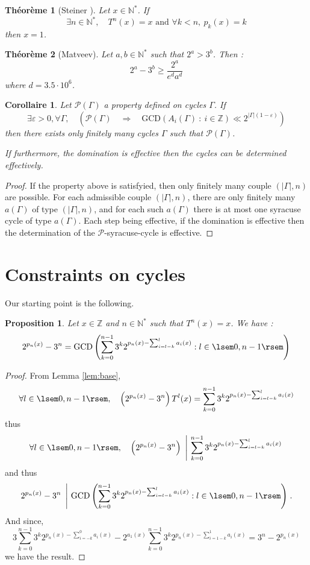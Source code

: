 \documentclass[12pt,a4paper]{article}
\newtheorem{cor}[lem]{Corollaire}
\newtheorem{prop}[lem]{Proposition}
\newtheorem{theo}{Théorème}
\def\NN{\mathbb{N}}
\def\ZZ{\mathbb{Z}}
\begin{document}
\begin{theo}[Steiner \cite{}] Let $x\in \NN^*$. 
If 
$$\exists n\in\NN^*,\quad T^n(x)=x \text{~and~} \forall k< n,~p_k(x)=k$$
then $x=1$.
\end{theo}

\begin{theo}[Matveev] Let $a,b\in \NN^*$ such that $2^a>3^b$.
 Then :
 $$2^a-3^b \geq \frac{2^a}{e^da^d} $$
 where $d = 3.5\cdot 10^6$.
\end{theo}
\begin{cor} Let $\mathcal P(\Gamma)$ a property defined on cycles $\Gamma$. If
$$\exists \varepsilon>0,\forall \Gamma, \quad \left(\mathcal P(\Gamma)\quad\Rightarrow \quad \mathrm{GCD}(A_i(\Gamma)~:~ i\in \ZZ) \ll  2^{|\Gamma|(1-\varepsilon)}\right) $$ then there exists only finitely many cycles $\Gamma$ such that $\mathcal P(\Gamma)$.

If furthermore, the domination is effective then the cycles can be determined effectively.
\end{cor}
\begin{proof}
 If the property above is satisfyied, then only finitely many couple $(|\Gamma|,n)$ are possible. For each admissible couple $(|\Gamma|,n)$, there are only finitely many $a(\Gamma)$ of type $(|\Gamma|,n)$, and for each such $a(\Gamma)$ there is at most one syracuse cycle of type $a(\Gamma)$. Each step being effective, if the domination is effective then the determination of the $\mathcal P$-syracuse-cycle  is effective.
\end{proof}
\section{Constraints on cycles}
Our starting point is the following.
\begin{prop} Let $x\in \ZZ$ and $n\in \NN^*$ such that $T^n(x)=x$. 
We have : 
$$ 2^{p_n(x)}-3^n = \mathrm{GCD}\left(\sum_{k=0}^{n-1}3^k 2^{p_n(x)-\sum_{i=l-k}^{l} a_i(x) } : l \in 
\lsem 0,n-1 \rsem \right) $$
\end{prop}
\begin{proof}
 From Lemma \ref{lem:base}, 
$$\forall l\in \lsem0,n-1\rsem,\quad\left( 2^{p_n(x)}-3^n\right)T^l(x) = \sum_{k=0}^{n-1}3^k 2^{p_n(x)-\sum_{i=l-k}^{l} a_i(x) }$$
thus 
$$\forall l\in \lsem0,n-1\rsem,\quad\left( 2^{p_n(x)}-3^n\right) ~\left|~ \sum_{k=0}^{n-1}3^k 2^{p_n(x)-\sum_{i=l-k}^{l} a_i(x) }\right.$$
and thus
$$2^{p_n(x)}-3^n ~\left| ~\mathrm{GCD}\left(\sum_{k=0}^{n-1}3^k 2^{p_n(x)-\sum_{i=l-k}^{l} a_i(x) } : l \in 
\lsem 0,n-1 \rsem \right)\right. 
.$$
And since, 
$$3\sum_{k=0}^{n-1}3^k 2^{p_n(x)-\sum_{i=-k}^{0} a_i(x) }-2^{a_1(x)}\sum_{k=0}^{n-1}3^k 2^{p_n(x)-\sum_{i=1-k}^{1} a_i(x) } = 3^n-2^{p_n(x)} $$
we have the result.
\end{proof}
\end{document}

